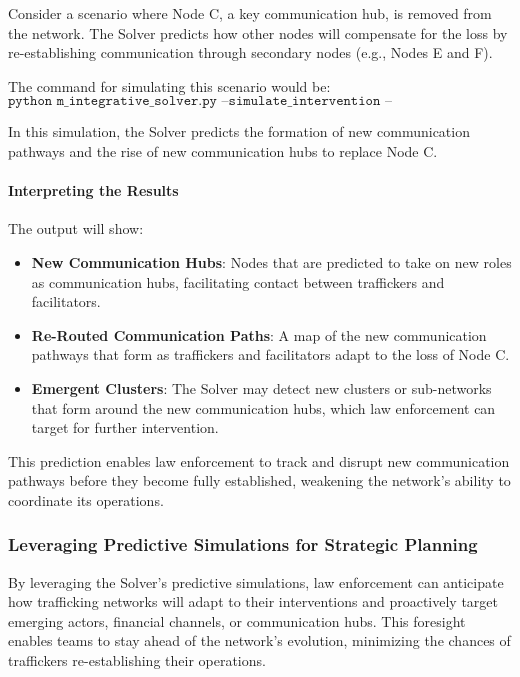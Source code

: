 \documentclass[%
 preprint, linenumbers,
 amsmath,amssymb,
 aps, physrev,
]{revtex4-2}
\begin{document}
Consider a scenario where Node C, a key communication hub, is removed from the network. The Solver predicts how other nodes will compensate for the loss by re-establishing communication through secondary nodes (e.g., Nodes E and F).

The command for simulating this scenario would be:
\[
\texttt{python m\_integrative\_solver.py --simulate\_intervention --disrupt\_communication --node\_id 310 --predict\_adaptation}
\]

In this simulation, the Solver predicts the formation of new communication pathways and the rise of new communication hubs to replace Node C.

\paragraph{Interpreting the Results}

The output will show:
\begin{itemize}
    \item \textbf{New Communication Hubs}: Nodes that are predicted to take on new roles as communication hubs, facilitating contact between traffickers and facilitators.
    \item \textbf{Re-Routed Communication Paths}: A map of the new communication pathways that form as traffickers and facilitators adapt to the loss of Node C.
    \item \textbf{Emergent Clusters}: The Solver may detect new clusters or sub-networks that form around the new communication hubs, which law enforcement can target for further intervention.
\end{itemize}

This prediction enables law enforcement to track and disrupt new communication pathways before they become fully established, weakening the network’s ability to coordinate its operations.

\subsubsection{Leveraging Predictive Simulations for Strategic Planning}

By leveraging the Solver’s predictive simulations, law enforcement can anticipate how trafficking networks will adapt to their interventions and proactively target emerging actors, financial channels, or communication hubs. This foresight enables teams to stay ahead of the network’s evolution, minimizing the chances of traffickers re-establishing their operations.
\end{document}
